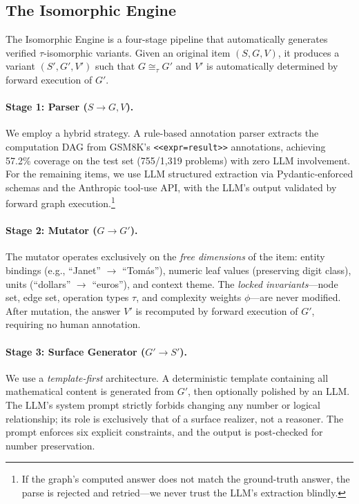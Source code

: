 \subsection{The Isomorphic Engine}
\label{sec:engine}

The Isomorphic Engine is a four-stage pipeline that automatically
generates verified $\tau$-isomorphic variants. Given an original item
$(S, G, V)$, it produces a variant $(S', G', V')$ such that
$G \cong_\tau G'$ and $V'$ is automatically determined by forward
execution of $G'$.

\paragraph{Stage 1: Parser ($S \to G, V$).}
We employ a hybrid strategy. A rule-based annotation parser extracts the
computation DAG from GSM8K's \texttt{<<expr=result>>} annotations,
achieving 57.2\% coverage on the test set (755/1{,}319 problems) with
zero LLM involvement. For the remaining items, we use LLM structured
extraction via Pydantic-enforced schemas and the Anthropic tool-use
API, with the LLM's output validated by forward graph
execution.\footnote{If the graph's computed answer does not match the
ground-truth answer, the parse is rejected and retried---we never trust
the LLM's extraction blindly.}

\paragraph{Stage 2: Mutator ($G \to G'$).}
The mutator operates exclusively on the \emph{free dimensions} of the
item: entity bindings (e.g., ``Janet'' $\to$ ``Tom\'{a}s''), numeric
leaf values (preserving digit class), units (``dollars'' $\to$
``euros''), and context theme. The \emph{locked invariants}---node set,
edge set, operation types $\tau$, and complexity weights $\phi$---are
never modified. After mutation, the answer $V'$ is recomputed by forward
execution of $G'$, requiring no human annotation.

\paragraph{Stage 3: Surface Generator ($G' \to S'$).}
We use a \emph{template-first} architecture. A deterministic template
containing all mathematical content is generated from $G'$, then
optionally polished by an LLM. The LLM's system prompt strictly forbids
changing any number or logical relationship; its role is exclusively
that of a surface realizer, not a reasoner. The prompt enforces six
explicit constraints, and the output is post-checked for number
preservation.

